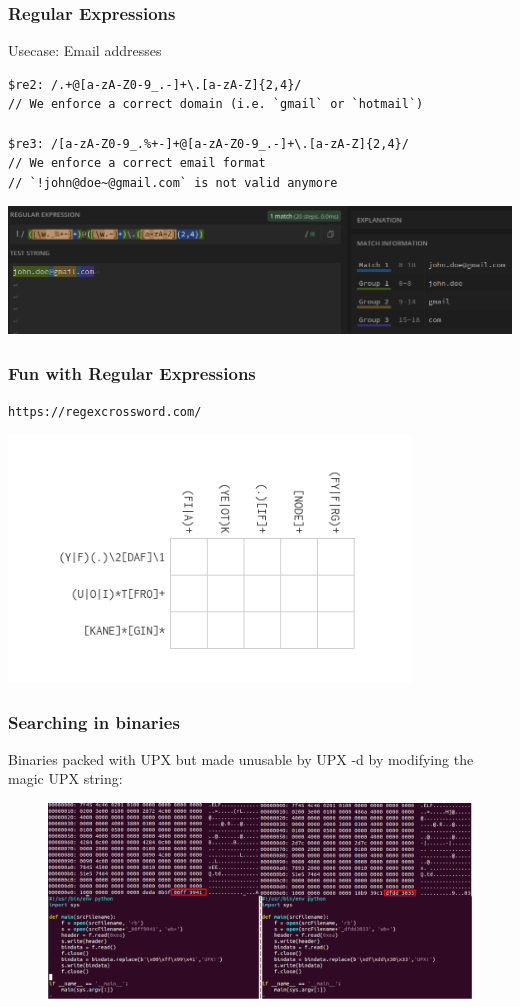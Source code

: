 \documentclass{beamer}
\begin{document}
\begin{frame}[fragile]
\frametitle{Regular Expressions}
Usecase: Email addresses
\begin{lstlisting}
$re2: /.+@[a-zA-Z0-9_.-]+\.[a-zA-Z]{2,4}/ 
// We enforce a correct domain (i.e. `gmail` or `hotmail`)

$re3: /[a-zA-Z0-9_.%+-]+@[a-zA-Z0-9_.-]+\.[a-zA-Z]{2,4}/ 
// We enforce a correct email format
// `!john@doe~@gmail.com` is not valid anymore

\end{lstlisting}

\begin{center}
\includegraphics[width=1.0\textwidth]{pics/regex101}
\end{center}
\end{frame}


\begin{frame}[fragile]
\frametitle{Fun with Regular Expressions}
\texttt{https://regexcrossword.com/}

\begin{center}
\includegraphics[width=0.8\textwidth]{pics/crosswords}
\end{center}
\end{frame}

\begin{frame}
  \frametitle{Searching in binaries}
Binaries packed with UPX but made unusable by UPX -d by modifying the magic UPX string:
  \begin{figure}[h]
    \includegraphics[width=\textwidth]{images/unpack.png}
  \end{figure}
\end{frame}
\end{document}
